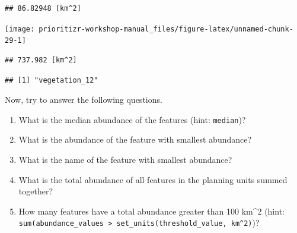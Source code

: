 \documentclass[12pt,]{book}
\makeatletter
\newenvironment{Shaded}{\begin{snugshade}}{\end{snugshade}}
\newcommand{\CommentTok}[1]{\textcolor[rgb]{0.56,0.35,0.01}{\textit{#1}}}
\newcommand{\DataTypeTok}[1]{\textcolor[rgb]{0.13,0.29,0.53}{#1}}
\newcommand{\KeywordTok}[1]{\textcolor[rgb]{0.13,0.29,0.53}{\textbf{#1}}}
\newcommand{\NormalTok}[1]{#1}
\newcommand{\OperatorTok}[1]{\textcolor[rgb]{0.81,0.36,0.00}{\textbf{#1}}}
\newcommand{\StringTok}[1]{\textcolor[rgb]{0.31,0.60,0.02}{#1}}
\providecommand{\tightlist}{%
  \setlength{\itemsep}{0pt}\setlength{\parskip}{0pt}}
\newenvironment{kframe}{%
\medskip{}
\setlength{\fboxsep}{.8em}
 \def\at@end@of@kframe{}%
 \ifinner\ifhmode%
  \def\at@end@of@kframe{\end{minipage}}%
  \begin{minipage}{\columnwidth}%
 \fi\fi%
 \def\FrameCommand##1{\hskip\@totalleftmargin \hskip-\fboxsep
 \colorbox{shadecolor}{##1}\hskip-\fboxsep
     \hskip-\linewidth \hskip-\@totalleftmargin \hskip\columnwidth}%
 \MakeFramed {\advance\hsize-\width
   \@totalleftmargin\z@ \linewidth\hsize
   \@setminipage}}%
 {\par\unskip\endMakeFramed%
 \at@end@of@kframe}
\newenvironment{rmdblock}[1]
  {
  \begin{itemize}
  \renewcommand{\labelitemi}{
    \raisebox{-.7\height}[0pt][0pt]{
      {\setkeys{Gin}{width=3em,keepaspectratio}\texttt{[image: images/\#1]}}
    }
  }
  \setlength{\fboxsep}{1em}
  \begin{kframe}
  \item
  }
  {
  \end{kframe}
  \end{itemize}
  }
\newenvironment{rmdquestion}
  {\begin{rmdblock}{question}}
  {\end{rmdblock}}
\makeatother
\begin{document}
\begin{verbatim}
## 86.82948 [km^2]
\end{verbatim}

\begin{Shaded}
\end{Shaded}

\begin{center}\texttt{[image: prioritizr-workshop-manual\_files/figure-latex/unnamed-chunk-29-1]} \end{center}

\begin{Shaded}
\end{Shaded}

\begin{verbatim}
## 737.982 [km^2]
\end{verbatim}

\begin{Shaded}
\end{Shaded}

\begin{verbatim}
## [1] "vegetation_12"
\end{verbatim}

Now, try to answer the following questions.

\begin{rmdquestion}
\begin{enumerate}
\def\labelenumi{\arabic{enumi}.}
\tightlist
\item
  What is the median abundance of the features (hint: \texttt{median})?
\item
  What is the abundance of the feature with smallest abundance?
\item
  What is the name of the feature with smallest abundance?
\item
  What is the total abundance of all features in the planning units summed together?
\item
  How many features have a total abundance greater than 100 km\^{}2 (hint: \texttt{sum(abundance\_values\ \textgreater{}\ set\_units(threshold\_value,\ km\^{}2)})?
\end{enumerate}
\end{rmdquestion}
\end{document}
